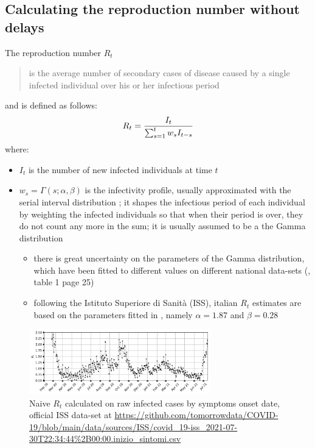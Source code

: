 \documentclass[graybox]{svmult}
\begin{document}
\subsection{Calculating the reproduction number without delays}
\label{indicator}
The reproduction number $R_t$ \cite{BettencourtRibeiro2008, CorietAl2013} \begin{quote}is the average number of secondary cases of disease caused by a single infected individual over his or her infectious period\end{quote}
and is defined as follows:
\begin{equation}
\large{R_t = \frac{I_t}{\sum_{s=1}^t w_s I_{t-s}}}
\label{RtDef}
\end{equation}
where:
\begin{itemize}
\item
$I_t$ is the number of new infected individuals at time $t$
\item 
$w_s=\Gamma(s; \alpha,\beta)$ is the infectivity profile, usually approximated with the serial interval distribution \cite{CorietAl2013}; it shapes the infectious period of each individual by weighting the infected individuals so that when their period is over, they do not count any more in the sum; it is usually assumed to be a the Gamma distribution \cite{CorietAl2013}
\begin{itemize}
\item 
there is great uncertainty on the parameters of the Gamma distribution, which have been fitted to different values on different national data-sets (\cite{RoyalSocSAGESPI-M}, table 1 page 25)
\item following the Istituto Superiore di Sanit\`{a} (ISS), italian $R_t$ estimates are based on the parameters fitted in \cite{CeredaetAl2020}, namely $\alpha = 1.87$ and $\beta = 0.28$
\end{itemize}
\end{itemize}

\begin{figure}[t]
\center
\includegraphics[width=0.7\textwidth]{Rt_images/naive_Rt_symptoms_onset.jpg}
\caption{Naive $R_t$ calculated on raw infected cases by symptoms onset date, official ISS data-set at \url{https://github.com/tomorrowdata/COVID-19/blob/main/data/sources/ISS/covid_19-iss_2021-07-30T22:34:44\%2B00:00.inizio_sintomi.csv}}
\label{naive_Rt_symptoms_onset}
\end{figure}
\end{document}

